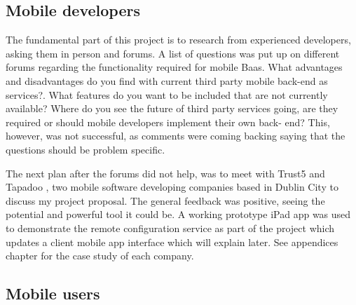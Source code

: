 


\subsection{Mobile developers}

The fundamental part of this project is to research from experienced developers, asking them in person and forums. A list of questions was put up on different forums regarding the functionality required for mobile Baas. What advantages and disadvantages do you find with current third party mobile back-end as services?. What features do you want to be included that are not currently available? Where do you see the future of third party services going, are they required or should mobile developers implement their own back- end? This, however, was not successful, as comments were coming backing saying that the questions should be problem specific.

The next plan after the forums did not help, was to meet with Trust5  \cite{trust5} and Tapadoo \cite{tapadoo}, two mobile software developing companies based in Dublin City to discuss my project proposal. The general feedback was positive, seeing the potential and powerful tool it could be. A working prototype iPad app was used to demonstrate the remote configuration service as part of the project which updates a client mobile app interface which will explain later. See appendices chapter for the case study of each company.

\subsection{Mobile users} \label{research:mobile_users}

